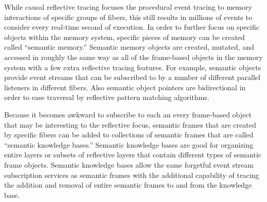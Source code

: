 While causal reflective tracing focuses the procedural event tracing
to memory interactions of specific groups of fibers, this still
results in millions of events to consider every real-time second of
execution.  In order to further focus on specific objects within the
memory system, specific pieces of memory can be created called
``semantic memory.''  Semantic memory objects are created, mutated,
and accessed in roughly the same way as all of the frame-based objects
in the memory system with a few extra reflective tracing features.
For example, semantic objects provide event streams that can be
subscribed to by a number of different parallel listeners in different
fibers.  Also semantic object pointers are bidirectional in order to
ease traversal by reflective pattern matching algorithms.

Because it becomes awkward to subscribe to each an every frame-based
object that may be interesting to the reflective focus, semantic
frames that are created by specific fibers can be added to collections
of semantic frames that are called ``semantic knowledge bases.''
Semantic knowledge bases are good for organizing entire layers or
subsets of reflective layers that contain different types of semantic
frame objects.  Semantic knowledge bases allow the same forgetful
event stream subscription services as semantic frames with the
additional capability of tracing the addition and removal of entire
semantic frames to and from the knowledge base.

